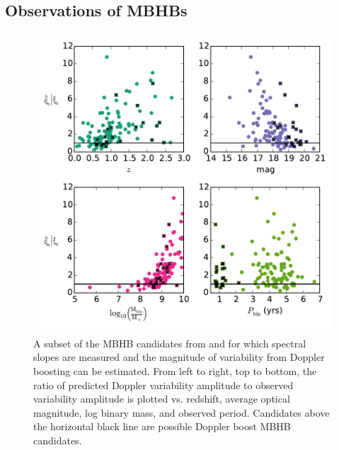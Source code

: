 \subsection{Observations of MBHBs}

\begin{figure}
\begin{center}
\includegraphics[scale=0.55]{figures/ch0/PTF_xsiGtr1_vs_z_M_P_alph_I90} 
\end{center}
\caption{
A subset of the MBHB candidates from \citep{Graham+2015b} and \citep[][denoted by black x's]{Charisi+2016} 
for which spectral slopes are measured and the
magnitude of variability from Doppler boosting can be estimated. From left to
right, top to bottom, the ratio of predicted Doppler variability amplitude to
observed variability amplitude is plotted vs. redshift, average optical
magnitude, log binary mass, and observed period. Candidates above the
horizontal black line are possible Doppler boost MBHB candidates.
}
\label{Fig:DopCan}
\end{figure}


